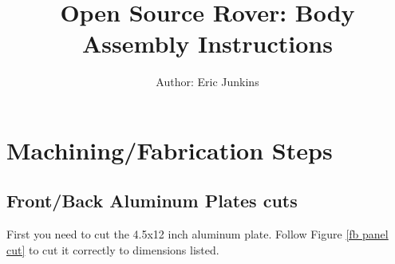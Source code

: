 \documentclass[12pt]{article}
\begin{document}
\title{Open Source Rover: Body Assembly Instructions}
\author{Author: Eric Junkins}

\makeatletter         
\def\@maketitle{
\begin{center}	
	\makebox[\textwidth][c]{ \texttt{[image: "Pictures/Body/Body title".png]}}
	{\Huge \bfseries \sffamily \@title }\\[3ex] 
	{\Large \sffamily \@author}\\[3ex] 
	\texttt{[image: "Pictures/Misc/JPL logo".png]}
\end{center}}
\makeatother

\maketitle




\newpage


\tableofcontents

\newpage

\section{Machining/Fabrication Steps}
\subsection{Front/Back Aluminum Plates cuts}

First you need to cut the 4.5x12 inch aluminum plate. Follow Figure \ref{fb panel cut} to cut it correctly to dimensions listed. 

\end{document}
